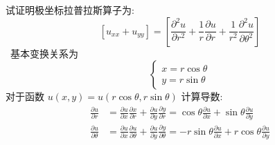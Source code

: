 \begin{frame}
	\frametitle{}
	试证明极坐标拉普拉斯算子为:
	\[[u_{xx}   +u_{yy}]= [ {	\frac{\partial^2 u }{\partial r^2 } +\frac{1}{r } \frac{\partial u }{\partial r } +
	\frac{1}{r^2 } \frac{\partial ^2 u }{\partial \theta ^2
	} }]\]
	\证 ~基本变换关系为 
\[ \begin{cases}
	 x=r\cos \theta\\
	 y=r\sin \theta
	\end{cases}\]
对于函数 $ u(x,y)=u(r\cos \theta,r\sin \theta)$ 计算导数:
\[
\begin{aligned}
	\frac{\partial u}{\partial r}&=\frac{\partial u}{\partial x } \frac{\partial x}{\partial r }+  \frac{\partial u}{\partial y } \frac{\partial y}{\partial r } = \cos \theta \frac{\partial u}{\partial x } +  \sin \theta \frac{\partial u}{\partial y } \\
	\frac{\partial u}{\partial \theta}&=\frac{\partial u}{\partial x } \frac{\partial u}{\partial \theta }+  \frac{\partial u}{\partial y } \frac{\partial y}{\partial \theta } = -r \sin \theta \frac{\partial u}{\partial x } +  r\cos \theta \frac{\partial u}{\partial y } \\
\end{aligned}\]
\end{frame}


